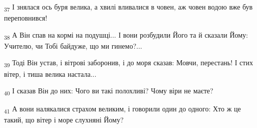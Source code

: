 \begin{tcolorbox}
\textsubscript{37} І знялася ось буря велика, а хвилі вливалися в човен, аж човен водою вже був переповнився!
\end{tcolorbox}
\begin{tcolorbox}
\textsubscript{38} А Він спав на кормі на подушці... І вони розбудили Його та й сказали Йому: Учителю, чи Тобі байдуже, що ми гинемо?...
\end{tcolorbox}
\begin{tcolorbox}
\textsubscript{39} Тоді Він устав, і вітрові заборонив, і до моря сказав: Мовчи, перестань! І стих вітер, і тиша велика настала...
\end{tcolorbox}
\begin{tcolorbox}
\textsubscript{40} І сказав Він до них: Чого ви такі полохливі? Чому віри не маєте?
\end{tcolorbox}
\begin{tcolorbox}
\textsubscript{41} А вони налякалися страхом великим, і говорили один до одного: Хто ж це такий, що вітер і море слухняні Йому?
\end{tcolorbox}
